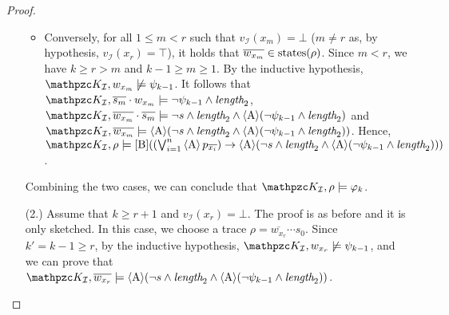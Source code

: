\begin{proof}
\begin{itemize}
\begin{itemize}
	\item Conversely, for all $1\leq m< r$ such that $v_\mathcal{I}(x_m)=\bot$ ($m\neq r$ as, by hypothesis, $v_\mathcal{I}(x_r)=\top$), it holds that $\overline{w_{x_m}}\in\operatorname{states}(\rho)$. Since $m<r$, we have $k\geq r>m$ and $k-1\geq m\geq 1$. By the inductive hypothesis, $\Ku_\mathcal{I},w_{x_m}\not\models \psi_{k-1}$. It follows that $\Ku_\mathcal{I},\overline{s_m}\cdot w_{x_m}\models \neg\psi_{k-1}\wedge \Length_2$, $\Ku_\mathcal{I},\overline{w_{x_m}}\cdot\overline{s_m}\models \neg s\wedge \Length_2\wedge\hsA(\neg\psi_{k-1}\wedge \Length_2)$ and $\Ku_\mathcal{I},\overline{w_{x_m}}\models\hsA( \neg s\wedge\Length_2\wedge\hsA(\neg\psi_{k-1}\wedge \Length_2))$. Hence, $\Ku_\mathcal{I},\rho\models \hsBu((\bigvee_{i=1}^n \hsA p_{\overline{x_i}})\rightarrow\hsA( \neg s\wedge\Length_2\wedge\hsA(\neg\psi_{k-1}\wedge \Length_2)))$.
\end{itemize} Combining the two cases, we can conclude that $\Ku_\mathcal{I},\rho\models \varphi_k$.
\item[(2.)] Assume that $k\geq r+1$ and $v_\mathcal{I}(x_r)=\bot$. The proof is as before and it is only sketched. In this case, we choose a trace $\rho=\overline{w_{x_r}}\cdots s_0$. Since $k'=k-1\geq r$, by the inductive hypothesis, $\Ku_\mathcal{I},w_{x_r}\not\models \psi_{k-1}$, and we can prove that $\Ku_\mathcal{I},\overline{w_{x_r}}\models\hsA( \neg s\wedge\Length_2\wedge\hsA(\neg\psi_{k-1}\wedge \Length_2))$.\qedhere
\end{itemize}
\end{proof}